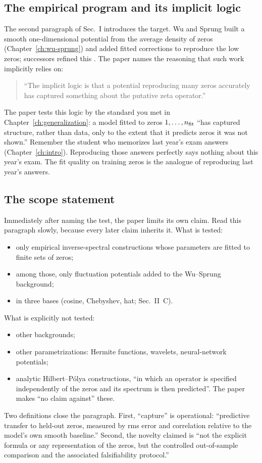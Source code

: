 \subsection{The empirical program and its implicit logic}

The second paragraph of Sec.~I introduces the target. Wu and Sprung \cite{wusprung} built a smooth one-dimensional potential from the average density of zeros (Chapter~\ref{ch:wu-sprung}) and added fitted corrections to reproduce the low zeros; successors refined this \cite{vanzyl,slater,jaksch}. The paper names the reasoning that such work implicitly relies on:

\begin{quote}
``The implicit logic is that a potential reproducing many zeros accurately has captured something about the putative zeta operator.''
\end{quote}

The paper tests this logic by the standard you met in Chapter~\ref{ch:generalization}: a model fitted to zeros $1,\dots,n_{\rm fit}$ ``has captured structure, rather than data, only to the extent that it predicts zeros it was not shown.'' Remember the student who memorizes last year's exam answers (Chapter~\ref{ch:intro}). Reproducing those answers perfectly says nothing about this year's exam. The fit quality on training zeros is the analogue of reproducing last year's answers.

\subsection{The scope statement}

Immediately after naming the test, the paper limits its own claim. Read this paragraph slowly, because every later claim inherits it. What is tested:
\begin{itemize}
\item only empirical inverse-spectral constructions whose parameters are fitted to finite sets of zeros;
\item among those, only fluctuation potentials added to the Wu--Sprung background;
\item in three bases (cosine, Chebyshev, hat; Sec.~II~C).
\end{itemize}
What is explicitly not tested:
\begin{itemize}
\item other backgrounds;
\item other parametrizations: Hermite functions, wavelets, neural-network potentials;
\item analytic Hilbert--P\'olya constructions, ``in which an operator is specified independently of the zeros and its spectrum is then predicted''. The paper makes ``no claim against'' these.
\end{itemize}
Two definitions close the paragraph. First, ``capture'' is operational: ``predictive transfer to held-out zeros, measured by rms error and correlation relative to the model's own smooth baseline.'' Second, the novelty claimed is ``not the explicit formula or any representation of the zeros, but the controlled out-of-sample comparison and the associated falsifiability protocol.''

